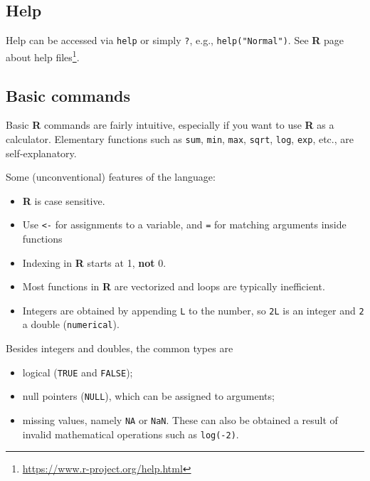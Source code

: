 \documentclass[
  11pt,
  letterpaper,
]{book}
\providecommand{\tightlist}{%
  \setlength{\itemsep}{0pt}\setlength{\parskip}{0pt}}
\renewcommand{\href}[2]{#2\footnote{\url{#1}}}
\theoremstyle{definition}
\theoremstyle{definition}
\theoremstyle{definition}
\theoremstyle{remark}
\begin{document}
\hypertarget{help}{%
\subsection{Help}\label{help}}

Help can be accessed via \texttt{help} or simply \texttt{?}, e.g., \texttt{help("Normal")}. \href{https://www.r-project.org/help.html}{See \textbf{R} page about help files}.

\hypertarget{basic-commands}{%
\subsection{Basic commands}\label{basic-commands}}

Basic \textbf{R} commands are fairly intuitive, especially if you want to use \textbf{R} as a calculator.
Elementary functions such as \texttt{sum}, \texttt{min}, \texttt{max}, \texttt{sqrt}, \texttt{log}, \texttt{exp}, etc., are self-explanatory.

Some (unconventional) features of the language:

\begin{itemize}
\tightlist
\item
  \textbf{R} is case sensitive.
\item
  Use \texttt{\textless{}-} for assignments to a variable, and \texttt{=} for matching arguments inside functions
\item
  Indexing in \textbf{R} starts at 1, \textbf{not} 0.
\item
  Most functions in \textbf{R} are vectorized and loops are typically inefficient.
\item
  Integers are obtained by appending \texttt{L} to the number, so \texttt{2L} is an integer and \texttt{2} a double (\texttt{numerical}).
\end{itemize}

Besides integers and doubles, the common types are

\begin{itemize}
\tightlist
\item
  logical (\texttt{TRUE} and \texttt{FALSE});
\item
  null pointers (\texttt{NULL}), which can be assigned to arguments;
\item
  missing values, namely \texttt{NA} or \texttt{NaN}. These can also be obtained a result of invalid mathematical operations such as \texttt{log(-2)}.
\end{itemize}
\end{document}
